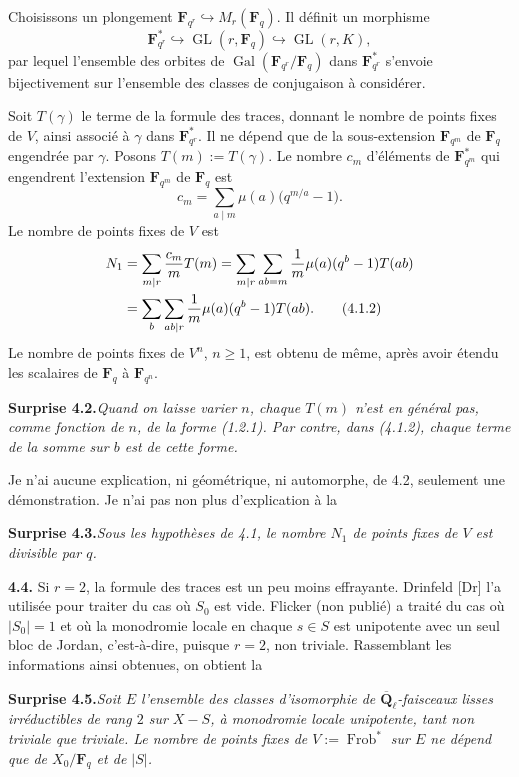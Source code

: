 \documentclass[11pt]{article}
\newcommand{\Fq}{\mathbf{F}_q}
\newcommand{\Fqn}{\mathbf{F}_{q^n}}
\newcommand{\Qbl}{\overline{\mathbf{Q}}_{\ell}}
\newcommand{\Gal}{\operatorname{Gal}}
\newcommand{\Frob}{\operatorname{Frob}}
\newcommand{\GL}{\operatorname{GL}}
\newcommand{\para}[1]{\medskip\noindent\textbf{#1}\enspace}
\begin{document}
Choisissons un plongement \(\mathbf{F}_{q^r}\hookrightarrow M_r(\Fq)\). Il définit un morphisme
\[
  \mathbf{F}_{q^r}^{*}\hookrightarrow \GL(r,\Fq)\hookrightarrow \GL(r,K),
\]
par lequel l'ensemble des orbites de \(\Gal(\mathbf{F}_{q^r}/\Fq)\) dans \(\mathbf{F}_{q^r}^{*}\) s'envoie bijectivement sur l'ensemble des classes de conjugaison à considérer.

Soit \(T(\gamma)\) le terme de la formule des traces, donnant le nombre de points fixes de \(V\), ainsi associé à \(\gamma\) dans \(\mathbf{F}_{q^r}^{*}\). Il ne dépend que de la sous-extension \(\mathbf{F}_{q^m}\) de \(\Fq\) engendrée par \(\gamma\). Posons \(T(m):=T(\gamma)\). Le nombre \(c_m\) d'éléments de \(\mathbf{F}_{q^m}^{*}\) qui engendrent l'extension \(\mathbf{F}_{q^m}\) de \(\Fq\) est
\[
  c_m=\sum_{a\mid m}\mu(a)\bigl(q^{m/a}-1\bigr).
\]
Le nombre de points fixes de \(V\) est
\begin{align}
N_1
&=\sum_{m\mid r}\frac{c_m}{m}T(m)
 =\sum_{m\mid r}\sum_{ab=m}\frac{1}{m}\mu(a)(q^b-1)T(ab) \notag\\
&=\sum_b\sum_{ab\mid r}\frac{1}{m}\mu(a)(q^b-1)T(ab).
\tag{4.1.2}
\end{align}
Le nombre de points fixes de \(V^n\), \(n\geq 1\), est obtenu de même, après avoir étendu les scalaires de \(\Fq\) à \(\Fqn\).

\noindent\textbf{Surprise 4.2.}\quad\textit{Quand on laisse varier \(n\), chaque \(T(m)\) n'est en général pas, comme fonction de \(n\), de la forme (1.2.1). Par contre, dans (4.1.2), chaque terme de la somme sur \(b\) est de cette forme.}

Je n'ai aucune explication, ni géométrique, ni automorphe, de 4.2, seulement une démonstration. Je n'ai pas non plus d'explication à la

\noindent\textbf{Surprise 4.3.}\quad\textit{Sous les hypothèses de 4.1, le nombre \(N_1\) de points fixes de \(V\) est divisible par \(q\).}

\para{4.4.} Si \(r=2\), la formule des traces est un peu moins effrayante. Drinfeld [Dr] l'a utilisée pour traiter du cas où \(S_0\) est vide. Flicker (non publié) a traité du cas où \(|S_0|=1\) et où la monodromie locale en chaque \(s\in S\) est unipotente avec un seul bloc de Jordan, c'est-à-dire, puisque \(r=2\), non triviale. Rassemblant les informations ainsi obtenues, on obtient la

\noindent\textbf{Surprise 4.5.}\quad\textit{Soit \(E\) l'ensemble des classes d'isomorphie de \(\Qbl\)-faisceaux lisses irréductibles de rang \(2\) sur \(X-S\), à monodromie locale unipotente, tant non triviale que triviale. Le nombre de points fixes de \(V:=\Frob^*\) sur \(E\) ne dépend que de \(X_0/\Fq\) et de \(|S|\).}
\end{document}
